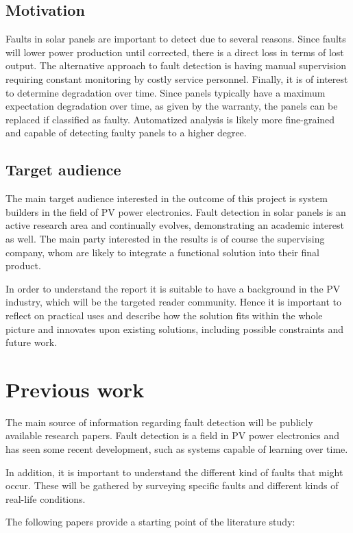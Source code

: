 \documentclass[a4paper,11pt]{article}
\begin{document}
\subsection*{Motivation}
Faults in solar panels are important to detect due to several reasons.
Since faults will lower power production until corrected, there is a direct loss in terms of lost output.
The alternative approach to fault detection is having manual supervision requiring constant monitoring by costly service personnel.
Finally, it is of interest to determine degradation over time.
Since panels typically have a maximum expectation degradation over time, as given by the warranty, the panels can be replaced if classified as faulty.
Automatized analysis is likely more fine-grained and capable of detecting faulty panels to a higher degree.

\subsection*{Target audience}
The main target audience interested in the outcome of this project is system builders in the field of PV power electronics.
Fault detection in solar panels is an active research area and continually evolves, demonstrating an academic interest as well.
The main party interested in the results is of course the supervising company, whom are likely to
integrate a functional solution into their final product.

In order to understand the report it is suitable to have a background in the PV industry, which will be the targeted reader community.
Hence it is important to reflect on practical uses and describe how the solution fits within the whole picture and innovates upon existing solutions, including possible constraints and future work.

\section*{Previous work}
The main source of information regarding fault detection will be publicly available research papers.
Fault detection is a field in PV power electronics and has seen some recent development, such as systems capable of learning over time.

In addition, it is important to understand the different kind of faults that might occur.
These will be gathered by surveying specific faults and different kinds of real-life conditions.

The following papers provide a starting point of the literature study:\\
\end{document}
